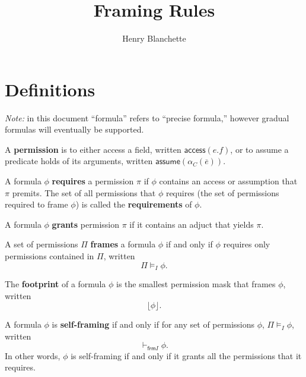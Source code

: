 \documentclass{article}
\title{Framing Rules}
\author{Henry Blanchette}
\date{}
\newcommand{\tsf}{\textsf}
\newcommand{\access}{\tsf{access}}
\newcommand{\assume}{\tsf{assume}}
\newcommand{\footprint}[1]{\lfloor #1 \rfloor}
\newcommand{\frames}{\vDash_I}
\newcommand{\selfframes}{\vdash_{\tsf{frm}I}}
\renewcommand{\vec}{\overline}
\begin{document}

\maketitle

\section{Definitions}

\textit{Note:} in this document ``formula'' refers to ``precise formula,'' however gradual formulas will eventually be supported.

\noindent
A \textbf{permission} is to either access a field, written $\access(e.f)$, or to assume a predicate holds of its arguments, written $\assume(\alpha_C(\vec{e}))$.

\noindent
A formula $\phi$ \textbf{requires} a permission $\pi$ if $\phi$ contains an access or assumption that $\pi$ premits. The set of all permissions that $\phi$ requires (the set of permissions required to frame $\phi$) is called the \textbf{requirements} of $\phi$.

\noindent
A formula $\phi$ \textbf{grants} permission $\pi$ if it contains an adjuct that yields $\pi$.

\noindent
A set of permissions $\Pi$ \textbf{frames} a formula $\phi$ if and only if $\phi$ requires only permissions contained in $\Pi$, written $$ \Pi \frames \phi. $$

\noindent
The \textbf{footprint} of a formula $\phi$ is the smallest permission mask that frames $\phi$, written $$ \footprint \phi. $$

\noindent
A formula $\phi$ is \textbf{self-framing} if and only if for any set of permissions $\phi$, $\Pi \frames \phi$, written $$ \selfframes \phi. $$
In other words, $\phi$ is self-framing if and only if it grants all the permissions that it requires.

\newpage
\end{document}
